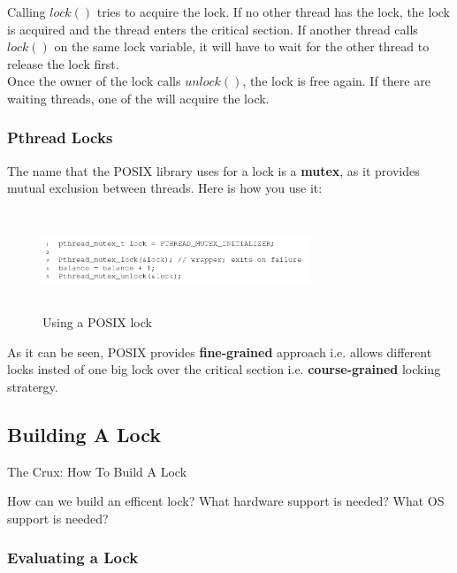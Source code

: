 Calling $lock()$ tries to acquire the lock. If no other thread has the lock, 
the lock is acquired and the thread enters the critical section. If another
thread calls $lock()$ on the same lock variable, it will have to wait for the
other thread to release the lock first.\\

Once the owner of the lock calls $unlock()$, the lock is free again. If there
are waiting threads, one of the will acquire the lock.

\subsubsection{Pthread Locks}

The name that the POSIX library uses for a lock is a \textbf{mutex}, as it 
provides mutual exclusion between threads. Here is how you use it:

\begin{figure}[h!]
    \begin{center}
        \includegraphics[width=8cm, height=3cm]{img/plocks.png}
        \caption{Using a POSIX lock}
    \end{center}
\end{figure}

As it can be seen, POSIX provides \textbf{fine-grained} approach i.e. allows 
different locks insted of one big lock over the critical section i.e. 
\textbf{course-grained} locking stratergy. 

\subsection{Building A Lock}

\begin{tcolorbox}
    \begin{center}
        The Crux: How To Build A Lock
    \end{center}

    How can we build an efficent lock? What hardware support is needed? What OS
    support is needed?
\end{tcolorbox}

\subsubsection{Evaluating a Lock}

